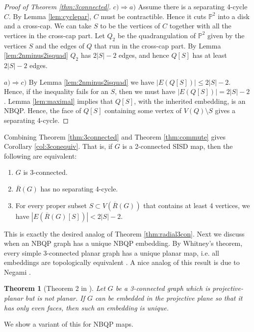 \documentclass[10pt,a4paper]{article}
\newtheorem{theorem}{Theorem}[section]
\newcommand{\Pb}[0]{\mathbb{P}}
\begin{document}
\begin{proof}[Proof of Theorem \ref{thm:3connected}]
    $c)\Rightarrow a)$ Assume there is a separating 4-cycle $C$. By Lemma \ref{lem:cyclepar}, $C$ must be contractible. Hence it cuts $\Pb^2$ into a disk and a cross-cap. We can take $S$ to be the vertices of $C$ together with all the vertices in the cross-cap part. Let $Q_2$ be the quadrangulation of $\Pb^2$ given by the vertices $S$ and the edges of $Q$ that run in the cross-cap part. By Lemma \ref{lem:2nminus2isquad}  $Q_2$  has $2|S|-2$ edges, and hence $Q[S]$ has at least $2|S|-2$ edges.

    $a)\Rightarrow c)$  By Lemma \ref{lem:2nminus2isquad} we have $|E(Q[S])|\le 2|S|-2$. Hence, if the inequality fails for an $S$, then we must have $|E(Q[S])|= 2|S|-2$. Lemma \ref{lem:maximal} implies that $Q[S]$, with the inherited embedding, is an NBQP. Hence, the face of $Q[S]$ containing some vertex of $V(Q)\setminus S$ gives a separating 4-cycle. 
    
\end{proof}



Combining Theorem \ref{thm:3connected} and Theorem \ref{thm:commute} gives Corollary \ref{col:3conequiv}. That is, if $G$ is a 2-connected SISD map, then the following are equivalent:
    \begin{enumerate}
        \item $G$ is 3-connected.
        \item $\overline R(G)$ has no separating 4-cycle.
        \item For every proper subset $S\subset V(\overline R(G))$ that contains at least 4 vertices, we have $|E(\overline R(G)[S])|< 2|S|-2$.
    \end{enumerate}

This is exactly the desired analog of Theorem \ref{thm:radial3con}. Next we discuss when an NBQP graph has a unique NBQP embedding. By Whitney's theorem, every simple 3-connected planar graph has a unique planar map, i.e. all embeddings are topologically equivalent \cite{whitney19332}. A nice analog of this result is due to Negami \cite{NE92}.

\begin{theorem}[Theorem 2 in \cite{NE92}]
Let $G$ be a 3-connected graph which is projective-planar but is not planar. If $G$ can be embedded in the projective plane so that it has only even faces, then such an embedding is unique. 
\end{theorem}

We show a variant of this for NBQP maps. 
\end{document}
